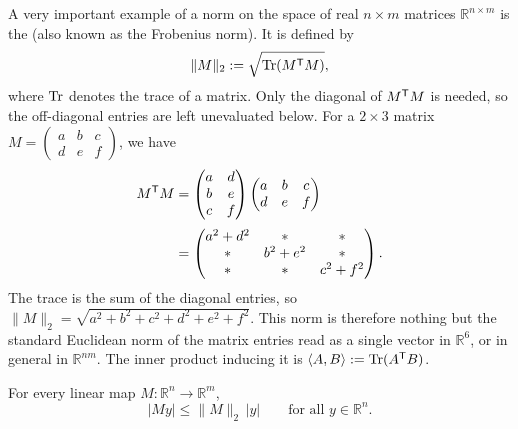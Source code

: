 \begin{example}
\label{ex:hilbert_schmidt_norm}
A very important example of a norm on the space of real $n \times m$ matrices
$\mathbb{R}^{n \times m}$ is the  (also known as the Frobenius
norm). It is defined by
\[
\|M\|_2 := \sqrt{\operatorname{Tr}(M^{\mathsf{T}} M)},
\]
where $\operatorname{Tr}$ denotes the trace of a matrix. Only the diagonal of $M^{\mathsf{T}} M$ is needed, so the
off-diagonal entries are left unevaluated below. For a $2 \times 3$ matrix
$M = \left(\begin{smallmatrix} a & b & c \\ d & e & f \end{smallmatrix}\right)$, we have
\begin{align*}
M^{\mathsf{T}} M
  &= \begin{pmatrix} a & d \\ b & e \\ c & f \end{pmatrix}
     \begin{pmatrix} a & b & c \\ d & e & f \end{pmatrix} \\[0.6ex]
  &= \begin{pmatrix} a^2+d^2 & * & * \\ * & b^2+e^2 & * \\ * & * & c^2+f^2 \end{pmatrix}.
\end{align*}
The trace is the sum of the diagonal entries, so $\|M\|_2 = \sqrt{a^2+b^2+c^2+d^2+e^2+f^2}$. This
norm is therefore nothing but the standard Euclidean norm of the matrix entries read as a single
vector in $\mathbb{R}^{6}$, or in general in $\mathbb{R}^{nm}$. The inner product inducing it is
$\langle A, B \rangle := \operatorname{Tr}(A^{\mathsf{T}} B)$.
\end{example}

\begin{lemma}
\label{lem:hilbert_schmidt_bounds_lengths}
For every linear map $M : \mathbb{R}^n \to \mathbb{R}^m$,
\[|My| \leq \|M\|_2\,|y| \qquad \text{for all } y \in \mathbb{R}^n.\]
\end{lemma}

